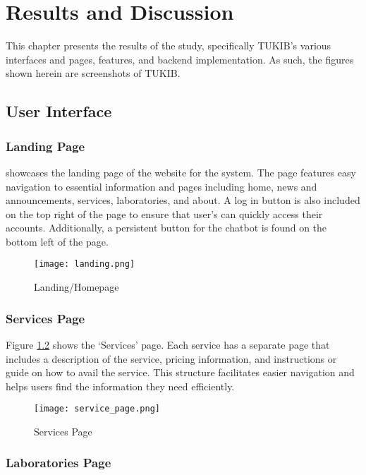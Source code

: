 \chapter{Results and Discussion}
This chapter presents the results of the study, specifically TUKIB's various interfaces and pages, features, and backend implementation. As such, the figures shown herein are screenshots of TUKIB.

\section{User Interface}

\subsection{Landing Page}

 showcases the landing page of the website for the system. The page features easy navigation to essential information and pages including home, news and announcements, services, laboratories, and about. A log in button is also included on the top right of the page to ensure that user's can quickly access their accounts. Additionally, a persistent button for the chatbot is found on the bottom left of the page. 

\begin{figure}[h]
	\centering 
	\texttt{[image: landing.png]}
	\caption{Landing/Homepage}
	\label{fig:landing}
\end{figure}

\subsection{Services Page}

Figure \ref{fig:service_page} shows the `Services' page. Each service has a separate page that includes a description of the service, pricing information, and instructions or guide on how to avail the service. This structure facilitates easier navigation and helps users find the information they need efficiently.

\begin{figure}[h]
	\centering
	\texttt{[image: service\_page.png]}
	\caption{Services Page}
	\label{fig:service_page}
\end{figure}

\newpage

\subsection{Laboratories Page}

